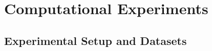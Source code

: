 \documentclass{llncs}
\begin{document}

\section{Computational Experiments}

\subsection{Experimental Setup and Datasets}
\label{sec:exp_setup}
\end{document}
